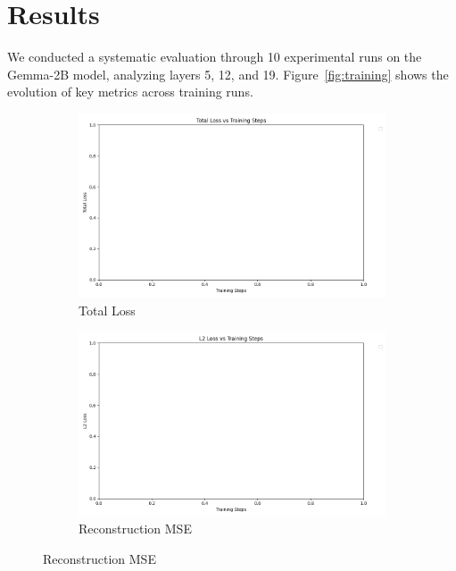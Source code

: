 \documentclass{article} %
\begin{document}
\section{Results}
\label{sec:results}

We conducted a systematic evaluation through 10 experimental runs on the Gemma-2B model, analyzing layers 5, 12, and 19. Figure~\ref{fig:training} shows the evolution of key metrics across training runs.

\begin{figure}[h]
    \centering
    \begin{subfigure}{0.24\textwidth}
        \includegraphics[width=\textwidth]{total_loss_comparison.png}
        \caption{Total Loss}
        \label{fig:total_loss}
    \end{subfigure}
    \hfill
    \begin{subfigure}{0.24\textwidth}
        \includegraphics[width=\textwidth]{l2_loss_comparison.png}
        \caption{Reconstruction MSE}
        \label{fig:l2_loss}
    \end{subfigure}

\end{figure}
\end{document}
